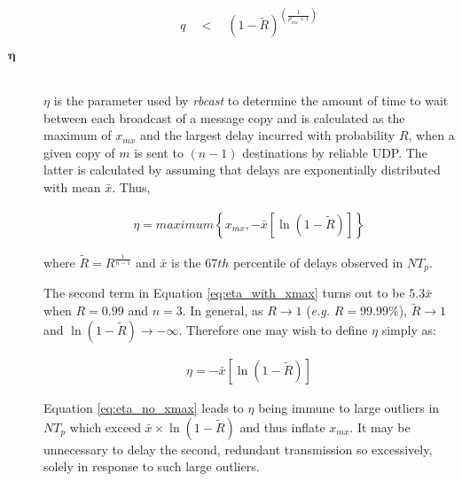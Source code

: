 \begin{description}
       \begin{equation}
            \begin{aligned}
                q \quad < \quad \left(1 - \tilde{R}\right)^{\left(\frac{1}{\rho_{mx} + 1} \right)}
            \end{aligned}
        \end{equation}

        \item[\Huge$\boldsymbol{\eta}$] \hfill \\
        $\eta$ is the parameter used by \emph{rbcast} to determine the amount of time to wait between each broadcast of a message copy and is calculated as the maximum of $x_{mx}$ and the largest delay incurred with probability $R$, when a given copy of $m$ is sent to $(n-1)$ destinations by reliable UDP.  The latter is calculated by assuming that delays are exponentially distributed with mean $\bar{x}$.  Thus,
        
        \begin{equation}
        \label{eq:eta_with_xmax}
            \begin{aligned}
                \eta = maximum \left\{ x_{mx}, -\bar{x}[\ln(1-\tilde{R})] \right\}
            \end{aligned}
        \end{equation}        
       
       where $\tilde{R} = R^{\frac{1}{n-1}}$ and $\bar{x}$ is the $67th$ percentile of delays observed in $NT_p$.  
        
        The second term in Equation \ref{eq:eta_with_xmax} turns out to be $5.3\bar{x}$ when $R = 0.99$ and $n=3$.  In general, as $R \rightarrow 1$ (\emph{e.g.} $R = 99.99\%$), $\tilde{R} \rightarrow 1$ and $\ln(1-\tilde{R}) \rightarrow -\infty$.  Therefore one may wish to define $\eta$ simply as:
        
        \begin{equation}
        \label{eq:eta_no_xmax}
            \begin{aligned}
                \eta=-\bar{x}[\ln(1-\tilde{R})]  
            \end{aligned}
        \end{equation}
        
        Equation \ref{eq:eta_no_xmax} leads to $\eta$ being immune to large outliers in $NT_p$ which exceed $\bar{x} \times \ln(1 - \tilde{R})$ and thus inflate $x_{mx}$.  It may be unnecessary to delay the second, redundant transmission so excessively, solely in response to such large outliers.  


\end{description}
